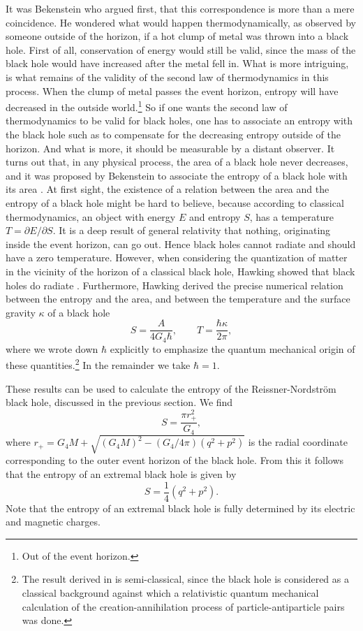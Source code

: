 \documentclass[12pt,twoside]{book}
\begin{document}
It was Bekenstein who argued first, that this correspondence is more than a mere coincidence. He wondered what would happen thermodynamically, as observed by someone outside of the horizon, if a hot clump of metal was thrown into a black hole. First of all, conservation of energy would still be valid, since the mass of the black hole would have increased after the metal fell in. What is more intriguing, is what remains of the validity of the second law of thermodynamics in this process. When the clump of metal passes the event horizon, entropy will have decreased in the outside world.\footnote{Out of the event horizon.}
So if one wants the second law of thermodynamics to be valid for black holes, one has to associate an entropy with the black hole such as to compensate for the decreasing entropy outside of the horizon. And what is more, it should be measurable by a distant observer. It turns out that, in any physical process, the area of a black hole never decreases, and it was proposed by Bekenstein to associate the entropy of a black hole with its area \cite{Bekenstein:1973ur}. At first sight, the existence of a relation between the area and the entropy of a black hole might be hard to believe, because according to classical thermodynamics, an object with energy $E$ and entropy $S$, has a temperature $T = \partial E / \partial S$. It is a deep result of general relativity that nothing, originating inside the event horizon, can go out. Hence black holes cannot radiate and should have a zero temperature. However, when considering the quantization of matter in the vicinity of the horizon of a classical black hole, Hawking showed that black holes do radiate \cite{Hawking:1974rv}. Furthermore, Hawking derived the precise numerical relation between the entropy and the area, and between the temperature and the surface gravity $\kappa$ of a black hole
\begin{equation}
S = \frac{A}{4G_{4} \hbar}, \qquad T = \frac{\hbar \kappa}{2 \pi},
\end{equation}
where we wrote down $\hbar$ explicitly to emphasize the quantum mechanical origin of these quantities.\footnote{
The result derived in \cite{Hawking:1974rv} is semi-classical, since the black hole is considered as a classical background against which a relativistic quantum mechanical calculation of the creation-annihilation process of particle-antiparticle pairs was done.} In the remainder we take $\hbar = 1$.

These results can be used to calculate the entropy of the Reissner-Nordstr\"om black hole, discussed in the previous section. We find
\begin{equation}
S = \frac{\pi r_{+}^{2}}{G_{4}},
\end{equation}
where $r_{+} = G_{4} M + \sqrt{(G_{4} M)^{2} - (G_{4} / 4\pi) (q^{2} + p^{2})}$ is the radial coordinate corresponding to the outer event horizon of the black hole. From this it follows that the entropy of an extremal black hole is given by
\begin{equation}
S = \frac{1}{4}(q^{2} + p^{2}).
\end{equation}
Note that the entropy of an extremal black hole is fully determined by its electric and magnetic charges.
\end{document}
